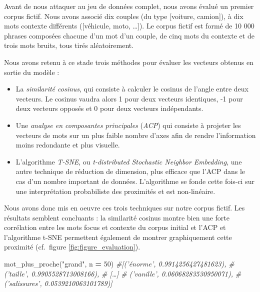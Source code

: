 \documentclass[11pt,french,french]{article}
\newenvironment{Shaded}{\begin{snugshade}}{\end{snugshade}}
\newcommand{\DecValTok}[1]{\textcolor[rgb]{0.00,0.00,0.81}{#1}}
\newcommand{\StringTok}[1]{\textcolor[rgb]{0.31,0.60,0.02}{#1}}
\newcommand{\CommentTok}[1]{\textcolor[rgb]{0.56,0.35,0.01}{\textit{#1}}}
\newcommand{\OperatorTok}[1]{\textcolor[rgb]{0.81,0.36,0.00}{\textbf{#1}}}
\newcommand{\NormalTok}[1]{#1}
\begin{document}
Avant de nous attaquer au jeu de données complet, nous avons évalué un
premier corpus fictif. Nous avons associé dix couples (du type
{[}voiture, camion{]}), à dix mots contexte différents ({[}véhicule,
moto, \ldots{}{]}). Le corpus fictif est formé de 10 000 phrases
composées chacune d'un mot d'un couple, de cinq mots du contexte et de
trois mots bruits, tous tirés aléatoirement.

Nous avons retenu à ce stade trois méthodes pour évaluer les vecteurs
obtenus en sortie du modèle :

\begin{itemize}
\item
  La \emph{similarité cosinus}, qui consiste à calculer le cosinus de
  l'angle entre deux vecteurs. Le cosinus vaudra alors 1 pour deux
  vecteurs identiques, -1 pour deux vecteurs opposés et 0 pour deux
  vecteurs indépendants.
\item
  Une \emph{analyse en composantes principales} (\emph{ACP}) qui
  consiste à projeter les vecteurs de mots sur un plus faible nombre
  d'axes afin de rendre l'information moins redondante et plus visuelle.
\item
  L'algorithme \emph{T-SNE}, ou \emph{t-distributed Stochastic Neighbor
  Embedding}, une autre technique de réduction de dimension, plus
  efficace que l'ACP dans le cas d'un nombre important de données.
  L'algorithme se fonde cette fois-ci sur une interprétation
  probabiliste des proximités et est non-linéaire.
\end{itemize}

Nous avons donc mis en oeuvre ces trois techniques sur notre corpus
fictif. Les résultats semblent concluants : la similarité cosinus montre
bien une forte corrélation entre les mots focus et contexte du corpus
initial et l'ACP et l'algorithme t-SNE permettent également de montrer
graphiquement cette proximité (cf.~figure \ref{fig:figure_evaluation}).

\footnotesize

\begin{Shaded}
\begin{Highlighting}[]
\NormalTok{mot_plus_proche(}\StringTok{"grand"}\NormalTok{, n }\OperatorTok{=} \DecValTok{50}\NormalTok{)}
\CommentTok{#[('énorme', 0.9914256427481623),}
\CommentTok{# ('taille', 0.9905528713008166),}
\CommentTok{# […]}
\CommentTok{# ('vanille', 0.06068283530950071),}
\CommentTok{# ('salissures', 0.0539210063101789)]}
\end{Highlighting}
\end{Shaded}
\end{document}
